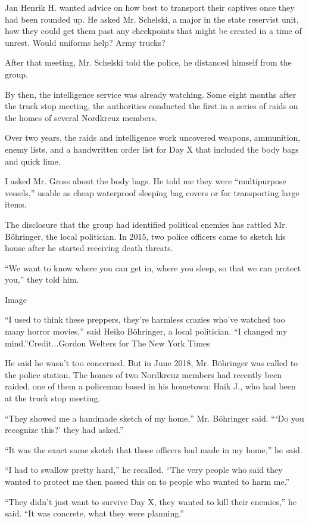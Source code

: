 Jan Henrik H. wanted advice on how best to transport their captives once
they had been rounded up. He asked Mr. Schelski, a major in the state
reservist unit, how they could get them past any checkpoints that might
be created in a time of unrest. Would uniforms help? Army trucks?

After that meeting, Mr. Schelski told the police, he distanced himself
from the group.

By then, the intelligence service was already watching. Some eight
months after the truck stop meeting, the authorities conducted the first
in a series of raids on the homes of several Nordkreuz members.

Over two years, the raids and intelligence work uncovered weapons,
ammunition, enemy lists, and a handwritten order list for Day X that
included the body bags and quick lime.

I asked Mr. Gross about the body bags. He told me they were
``multipurpose vessels,'' usable as cheap waterproof sleeping bag covers
or for transporting large items.

The disclosure that the group had identified political enemies has
rattled Mr. Böhringer, the local politician. In 2015, two police
officers came to sketch his house after he started receiving death
threats.

``We want to know where you can get in, where you sleep, so that we can
protect you,'' they told him.

Image

``I used to think these preppers, they're harmless crazies who've
watched too many horror movies,'' said Heiko Böhringer, a local
politician. ``I changed my mind.''Credit...Gordon Welters for The New
York Times

He said he wasn't too concerned. But in June 2018, Mr. Böhringer was
called to the police station. The homes of two Nordkreuz members had
recently been raided, one of them a policeman based in his hometown:
Haik J., who had been at the truck stop meeting.

``They showed me a handmade sketch of my home,'' Mr. Böhringer said.
```Do you recognize this?' they had asked.''

``It was the exact same sketch that those officers had made in my
home,'' he said.

``I had to swallow pretty hard,'' he recalled. ``The very people who
said they wanted to protect me then passed this on to people who wanted
to harm me.''

``They didn't just want to survive Day X, they wanted to kill their
enemies,'' he said. ``It was concrete, what they were planning.''

